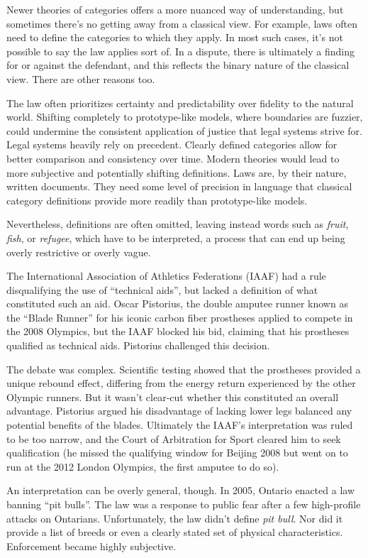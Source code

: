 Newer theories of categories offers a more nuanced way of understanding, but sometimes there's no getting away from a classical view. For example, laws often need to define the categories to which they apply. In most such cases, it's not possible to say the law applies sort of. In a dispute, there is ultimately a finding for or against the defendant, and this reflects the binary nature of the classical view. There are other reasons too.

The law often prioritizes certainty and predictability over fidelity to the natural world. Shifting completely to prototype-like models, where boundaries are fuzzier, could undermine the consistent application of justice that legal systems strive for. Legal systems heavily rely on precedent. Clearly defined categories allow for better comparison and consistency over time. Modern theories would lead to more subjective and potentially shifting definitions. Laws are, by their nature, written documents. They need some level of precision in language that classical category definitions provide more readily than prototype-like models.

Nevertheless, definitions are often omitted, leaving instead words such as \textit{fruit}, \textit{fish}, or \textit{refugee}, which have to be interpreted, a process that can end up being overly restrictive or overly vague.

The International Association of Athletics Federations (IAAF) had a rule disqualifying the use of ``technical aids'', but lacked a definition of what constituted such an aid. Oscar Pistorius, the double amputee runner known as the ``Blade Runner'' for his iconic carbon fiber prostheses applied to compete in the 2008 Olympics, but the IAAF blocked his bid, claiming that his prostheses qualified as technical aids. Pistorius challenged this decision.

The debate was complex. Scientific testing showed that the prostheses provided a unique rebound effect, differing from the energy return experienced by the other Olympic runners. But it wasn't clear-cut whether this constituted an overall advantage. Pistorius argued his disadvantage of lacking lower legs balanced any potential benefits of the blades. Ultimately the IAAF's interpretation was ruled to be too narrow, and the Court of Arbitration for Sport cleared him to seek qualification (he missed the qualifying window for Beijing 2008 but went on to run at the 2012 London Olympics, the first amputee to do so).

An interpretation can be overly general, though. In 2005, Ontario enacted a law banning ``pit bulls''. The law was a response to public fear after a few high-profile attacks on Ontarians. Unfortunately, the law didn't define \textit{pit bull}. Nor did it provide a list of breeds or even a clearly stated set of physical characteristics. Enforcement became highly subjective.

